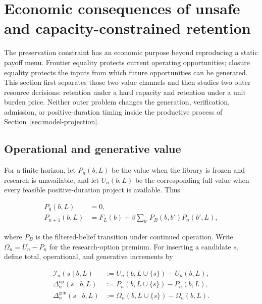 \section{Economic consequences of unsafe and capacity-constrained retention}
\label{sec:economic-implications}
\label{sec:value}

The preservation constraint has an economic purpose beyond reproducing a
static payoff menu. Frontier equality protects current operating
opportunities; closure equality protects the inputs from which future
opportunities can be generated. This section first separates those two value
channels and then studies two outer resource decisions: retention under a hard
capacity and retention under a unit burden price. Neither outer problem
changes the generation, verification, admission, or positive-duration timing
inside the productive process of Section~\ref{sec:model-projection}.

\subsection{Operational and generative value}

For a finite horizon, let \(P_n(b,L)\) be the value when the library is frozen
and research is unavailable, and let \(U_n(b,L)\) be the corresponding full
value when every feasible positive-duration project is available. Thus

\begin{align}
 P_0(b,L)&=0,\nonumber\\
 P_{n+1}(b,L)&=F_L(b)+\beta
   \sum_{b'}P_B(b,b')P_n(b',L),
 \label{eq:passive-value}
\end{align}

where \(P_B\) is the filtered-belief transition under continued operation.
Write \(\Omega_n=U_n-P_n\) for the research-option premium. For inserting a
candidate \(s\), define total, operational, and generative increments by

\begin{align}
 \mathcal I_n(s\mid b,L)
   &:=U_n(b,L\cup\{s\})-U_n(b,L),\nonumber\\
 \Delta_n^{\mathrm{op}}(s\mid b,L)
   &:=P_n(b,L\cup\{s\})-P_n(b,L),\nonumber\\
 \Delta_n^{\mathrm{gen}}(s\mid b,L)
   &:=\Omega_n(b,L\cup\{s\})-\Omega_n(b,L).
 \label{eq:value-channels}
\end{align}

